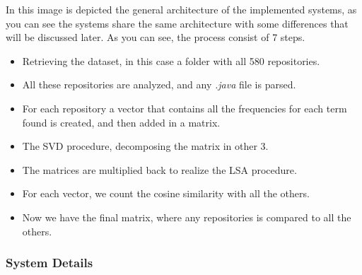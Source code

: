 In this image is depicted the general architecture of the implemented systems, as you can see the systems share the same architecture with some differences that will be discussed later.
As you can see, the process consist of 7 steps.
\begin{itemize}
 \item Retrieving the dataset, in this case a folder with all 580 repositories.
 \item All these repositories are analyzed, and any \emph{.java} file is parsed.
 \item For each repository a vector that contains all the frequencies for each term found is created, and then added in a matrix. 
 \item The SVD procedure, decomposing the matrix in other 3.
 \item The matrices are multiplied back to realize the LSA procedure.
 \item For each vector, we count the cosine similarity with all the others.
 \item Now we have the final matrix, where any repositories is compared to all the others.
\end{itemize} 

\subsubsection{System Details}

